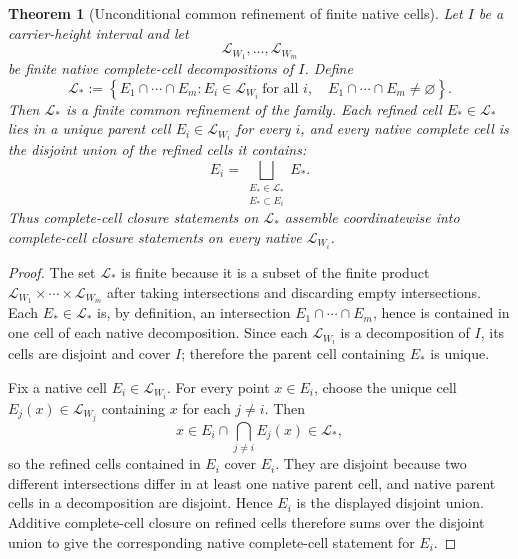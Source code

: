\documentclass[11pt]{article}
\newtheorem{theorem}{Theorem}
\theoremstyle{definition}
\begin{document}
\begin{theorem}[Unconditional common refinement of finite native cells]\label{thm:g10-common-refinement}
Let \(I\) be a carrier-height interval and let
\[
\mathcal L_{W_1},\ldots,\mathcal L_{W_m}
\]
be finite native complete-cell decompositions of \(I\).  Define
\[
\mathcal L_*:=
\left\{
E_1\cap\cdots\cap E_m:
E_i\in\mathcal L_{W_i}\ \text{for all }i,\quad
E_1\cap\cdots\cap E_m\ne\varnothing
\right\}.
\]
Then \(\mathcal L_*\) is a finite common refinement of the family.  Each
refined cell \(E_*\in\mathcal L_*\) lies in a unique parent cell
\(E_i\in\mathcal L_{W_i}\) for every \(i\), and every native complete cell is
the disjoint union of the refined cells it contains:
\[
E_i=
\bigsqcup_{\substack{E_*\in\mathcal L_*\\ E_*\subset E_i}}E_*.
\]
Thus complete-cell closure statements on \(\mathcal L_*\) assemble
coordinatewise into complete-cell closure statements on every native
\(\mathcal L_{W_i}\).
\end{theorem}

\begin{proof}
The set \(\mathcal L_*\) is finite because it is a subset of the finite product
\(\mathcal L_{W_1}\times\cdots\times\mathcal L_{W_m}\) after taking
intersections and discarding empty intersections.  Each \(E_*\in\mathcal L_*\)
is, by definition, an intersection \(E_1\cap\cdots\cap E_m\), hence is
contained in one cell of each native decomposition.  Since each
\(\mathcal L_{W_i}\) is a decomposition of \(I\), its cells are disjoint and
cover \(I\); therefore the parent cell containing \(E_*\) is unique.

Fix a native cell \(E_i\in\mathcal L_{W_i}\).  For every point \(x\in E_i\),
choose the unique cell \(E_j(x)\in\mathcal L_{W_j}\) containing \(x\) for each
\(j\ne i\).  Then
\[
x\in E_i\cap\bigcap_{j\ne i}E_j(x)\in\mathcal L_*,
\]
so the refined cells contained in \(E_i\) cover \(E_i\).  They are disjoint
because two different intersections differ in at least one native parent cell,
and native parent cells in a decomposition are disjoint.  Hence \(E_i\) is the
displayed disjoint union.  Additive complete-cell closure on refined cells
therefore sums over the disjoint union to give the corresponding native
complete-cell statement for \(E_i\).
\end{proof}
\end{document}
